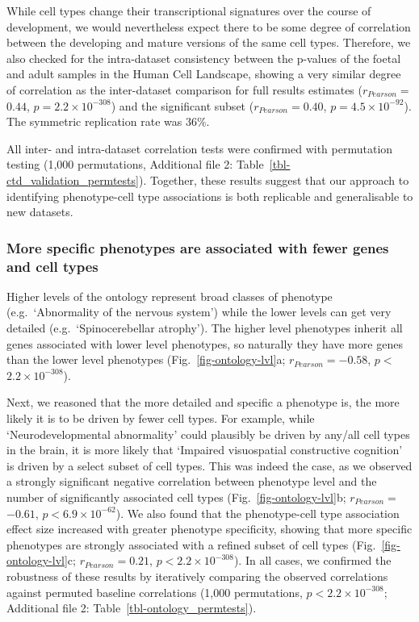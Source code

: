 \documentclass[
]{article}
\begin{document}
While cell types change their transcriptional signatures over the course
of development, we would nevertheless expect there to be some degree of
correlation between the developing and mature versions of the same cell
types. Therefore, we also checked for the intra-dataset consistency
between the p-values of the foetal and adult samples in the Human Cell
Landscape, showing a very similar degree of correlation as the
inter-dataset comparison for full results estimates
(\(r_{Pearson}=\)\(0.44\), \(p=\)\(2.2 \times 10^{-308}\)) and the
significant subset (\(r_{Pearson}=\)\(0.40\),
\(p=\)\(4.5 \times 10^{-92}\)). The symmetric replication rate was 36\%.

All inter- and intra-dataset correlation tests were confirmed with
permutation testing (1,000 permutations, Additional file 2:
Table~\ref{tbl-ctd_validation_permtests}). Together, these results
suggest that our approach to identifying phenotype-cell type
associations is both replicable and generalisable to new datasets.

\subsubsection{More specific phenotypes are associated with fewer genes
and cell
types}\label{more-specific-phenotypes-are-associated-with-fewer-genes-and-cell-types-1}

Higher levels of the ontology represent broad classes of phenotype
(e.g.~`Abnormality of the nervous system') while the lower levels can
get very detailed (e.g.~`Spinocerebellar atrophy'). The higher level
phenotypes inherit all genes associated with lower level phenotypes, so
naturally they have more genes than the lower level phenotypes
(Fig.~\ref{fig-ontology-lvl}a; \(r_{Pearson}=\)\(-0.58\),
\(p<\)\(2.2 \times 10^{-308}\)).

Next, we reasoned that the more detailed and specific a phenotype is,
the more likely it is to be driven by fewer cell types. For example,
while `Neurodevelopmental abnormality' could plausibly be driven by
any/all cell types in the brain, it is more likely that `Impaired
visuospatial constructive cognition' is driven by a select subset of
cell types. This was indeed the case, as we observed a strongly
significant negative correlation between phenotype level and the number
of significantly associated cell types (Fig.~\ref{fig-ontology-lvl}b;
\(r_{Pearson}=\)\(-0.61\), \(p<\)\(6.9 \times 10^{-62}\)). We also found
that the phenotype-cell type association effect size increased with
greater phenotype specificity, showing that more specific phenotypes are
strongly associated with a refined subset of cell types
(Fig.~\ref{fig-ontology-lvl}c; \(r_{Pearson}=\)\(0.21\),
\(p<\)\(2.2 \times 10^{-308}\)). In all cases, we confirmed the
robustness of these results by iteratively comparing the observed
correlations against permuted baseline correlations (1,000 permutations,
\(p<\)\(2.2 \times 10^{-308}\); Additional file 2:
Table~\ref{tbl-ontology_permtests}).
\end{document}
